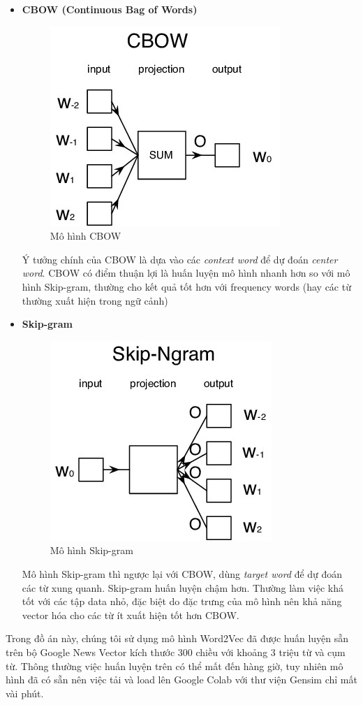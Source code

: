 \documentclass[12pt,a4paper,oneside]{book}
\begin{document}
	\begin{itemize}
	\item \textbf{CBOW (Continuous Bag of Words)} 
	
	\begin{figure}[H]
		\begin{center}
			\includegraphics[width=0.32\columnwidth]{cbow}
		\end{center}
		\caption{Mô hình CBOW}
	\end{figure}
	Ý tưởng chính của CBOW là dựa vào các \textit{context word} để dự đoán \textit{center word}. CBOW có điểm thuận lợi là huấn luyện mô hình nhanh hơn so với mô hình Skip-gram, thường cho kết quả tốt hơn với frequency words (hay các từ thường xuất hiện trong ngữ cảnh)
	\item \textbf{Skip-gram}
	
	\begin{figure}[H]
		\begin{center}
			\includegraphics[width=0.32\columnwidth]{skipgram}
		\end{center}
		\caption{Mô hình Skip-gram}
	\end{figure}
		
	Mô hình Skip-gram thì ngược lại với CBOW, dùng \textit{target word} để dự đoán các từ xung quanh. Skip-gram huấn luyện chậm hơn. Thường làm việc khá tốt với các tập data nhỏ, đặc biệt do đặc trưng của mô hình nên khả năng vector hóa cho các từ ít xuất hiện tốt hơn CBOW.
	
	\end{itemize}
	
	Trong đồ án này, chúng tôi sử dụng mô hình Word2Vec đã được huấn luyện sẵn trên bộ Google News Vector kích thước 300 chiều với khoảng 3 triệu từ và cụm từ. Thông thường việc huấn luyện trên có thể mất đến hàng giờ, tuy nhiên mô hình đã có sẵn nên việc tải và load lên Google Colab với thư viện Gensim chỉ mất vài phút. 
	
\end{document}
